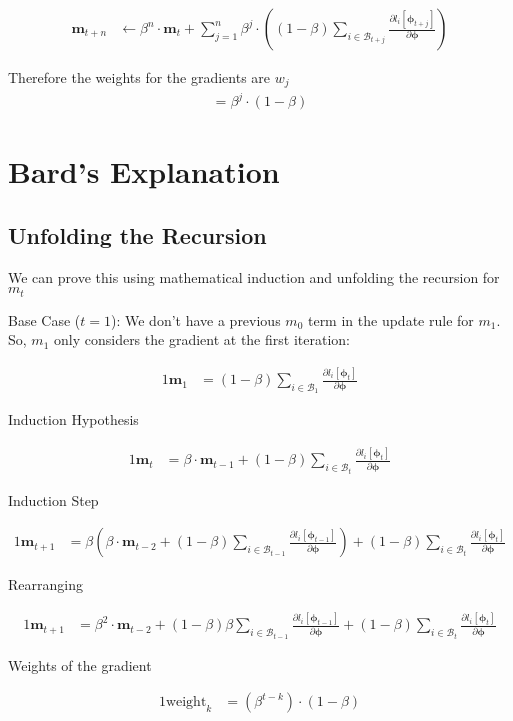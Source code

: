 \documentclass{article}
\begin{document}
\begin{align*}
    \boldsymbol{m}_{t+n} &\leftarrow \beta^{n} \cdot 
    \boldsymbol{m}_{t}
    + \sum_{j = 1}^{n}\beta^{j} \cdot 
    \left(
        (1 - \beta)\sum_{i \in \mathcal{B}_{t+j}}
         \frac{\partial{l_{i}[\boldsymbol{\phi}_{t+j}]}}{\partial{\boldsymbol{\phi}}}
    \right)
\end{align*}

Therefore the weights for the gradients are $w_j$
\begin{align*}
     = \beta^{j} \cdot (1 - \beta)
\end{align*}


\section{Bard's Explanation}

\subsection{Unfolding the Recursion}

We can prove this using mathematical induction and unfolding the recursion for $ m_{t} $

Base Case ($t = 1$):
We don't have a previous $m_{0}$ term in the update rule for $m_{1}$. So, $m_{1}$ only considers the gradient at the first iteration:

\begin{alignat*}{1}
    \boldsymbol{m}_1 &= (1 - \beta) \sum_{i \in \mathcal{B}_1} \frac{\partial{l_i[\boldsymbol{\phi}_t]}}{\partial{\boldsymbol{\phi}}}
\end{alignat*}

Induction Hypothesis

\begin{alignat*}{1}
    \boldsymbol{m}_t &= \beta \cdot \boldsymbol{m}_{t-1} + (1 - \beta) \sum_{i \in \mathcal{B}_t} \frac{\partial{l_i[\boldsymbol{\phi}_t]}}{\partial{\boldsymbol{\phi}}}
\end{alignat*}

Induction Step

\begin{alignat*}{1}
\boldsymbol{m}_{t+1} &= \beta \left( \beta \cdot \boldsymbol{m}_{t-2} + (1 - \beta) \sum_{i \in \mathcal{B}_{t-1}} \frac{\partial{l_i[\boldsymbol{\phi}_{t-1}]}}{\partial{\boldsymbol{\phi}}} \right) + (1 - \beta) \sum_{i \in \mathcal{B}_t} \frac{\partial{l_i[\boldsymbol{\phi}_t]}}{\partial{\boldsymbol{\phi}}}
\end{alignat*}

Rearranging

\begin{alignat*}{1}
    \boldsymbol{m}_{t+1} &= \beta^2 \cdot \boldsymbol{m}_{t-2} + (1 - \beta) \beta \sum_{i \in \mathcal{B}_{t-1}} \frac{\partial{l_i[\boldsymbol{\phi}_{t-1}]}}{\partial{\boldsymbol{\phi}}} + (1 - \beta) \sum_{i \in \mathcal{B}_t} \frac{\partial{l_i[\boldsymbol{\phi}_t]}}{\partial{\boldsymbol{\phi}}}
\end{alignat*}

Weights of the gradient

\begin{alignat*}{1}
    \text{weight}_k &= (\beta^{t-k}) \cdot (1 - \beta)
\end{alignat*}
\end{document}
